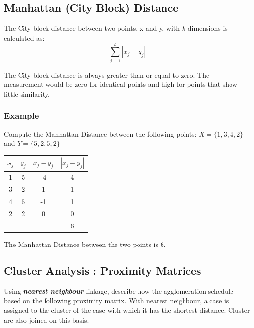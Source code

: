 \documentclass[12pt]{article}
\begin{document}
\subsection{Manhattan (City Block) Distance}
The City block distance between two points, x and y, with $k$ dimensions is calculated as:
\[ \sum^{k}_{j=1} | x_j - y_j |  \]

\noindent The City block distance is always greater than or equal to zero. The measurement would be zero for identical points and high for points that show little similarity.

\subsubsection{{\large Example}}
Compute the Manhattan Distance between the following points: 
$X = \{1,3,4,2\}$ and $Y = \{5,2,5,2\}$


\begin{center}
	\begin{tabular}{|c|c|c|c|}
		\hline
		$x_j$	&	$y_j$	&   $x_j - y_j$	&	$| x_j - y_j |$	\\ \hline
		1	&	5	&	-4	&	4	\\
		3	&	2	&	1	&	1	\\
		4	&	5	&	-1	&	1	\\
		2	&	2	&	0	&	0	\\ \hline
		& & & 6 \\
		\hline
	\end{tabular}
\end{center}
The Manhattan Distance between the two points is 6.

\newpage
\subsection{{\large Cluster Analysis : Proximity Matrices}}

Using \textbf{\textit{nearest neighbour}} linkage, describe how the agglomeration schedule based on the following 
proximity matrix. With nearest neighbour, a case is assigned to the cluster of the case with which it has the shortest distance. Cluster are also joined on this basis.
\end{document}
